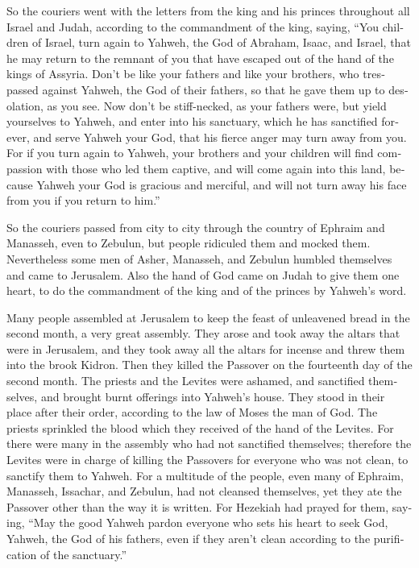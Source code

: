 \begin{paracol}{2}
\begin{otherlanguage}{english}
 So the couriers went with the letters from the king and
his princes throughout all Israel and Judah, according to the
commandment of the king, saying, ``You children of Israel, turn again to
Yahweh, the God of Abraham, Isaac, and Israel, that he may return to the
remnant of you that have escaped out of the hand of the kings of
Assyria.  Don't be like your fathers and like your
brothers, who trespassed against Yahweh, the God of their fathers, so
that he gave them up to desolation, as you see.  Now don't
be stiff-necked, as your fathers were, but yield yourselves to Yahweh,
and enter into his sanctuary, which he has sanctified forever, and serve
Yahweh your God, that his fierce anger may turn away from you.
 For if you turn again to Yahweh, your brothers and your
children will find compassion with those who led them captive, and will
come again into this land, because Yahweh your God is gracious and
merciful, and will not turn away his face from you if you return to
him.''

 So the couriers passed from city to city through the
country of Ephraim and Manasseh, even to Zebulun, but people ridiculed
them and mocked them.  Nevertheless some men of Asher,
Manasseh, and Zebulun humbled themselves and came to Jerusalem.
 Also the hand of God came on Judah to give them one
heart, to do the commandment of the king and of the princes by Yahweh's
word.

 Many people assembled at Jerusalem to keep the feast of
unleavened bread in the second month, a very great assembly.
 They arose and took away the altars that were in
Jerusalem, and they took away all the altars for incense and threw them
into the brook Kidron.  Then they killed the Passover on
the fourteenth day of the second month. The priests and the Levites were
ashamed, and sanctified themselves, and brought burnt offerings into
Yahweh's house.  They stood in their place after their
order, according to the law of Moses the man of God. The priests
sprinkled the blood which they received of the hand of the Levites.
 For there were many in the assembly who had not
sanctified themselves; therefore the Levites were in charge of killing
the Passovers for everyone who was not clean, to sanctify them to
Yahweh.  For a multitude of the people, even many of
Ephraim, Manasseh, Issachar, and Zebulun, had not cleansed themselves,
yet they ate the Passover other than the way it is written. For Hezekiah
had prayed for them, saying, ``May the good Yahweh pardon everyone
 who sets his heart to seek God, Yahweh, the God of his
fathers, even if they aren't clean according to the purification of the
sanctuary.''


\end{otherlanguage}
\end{paracol}
